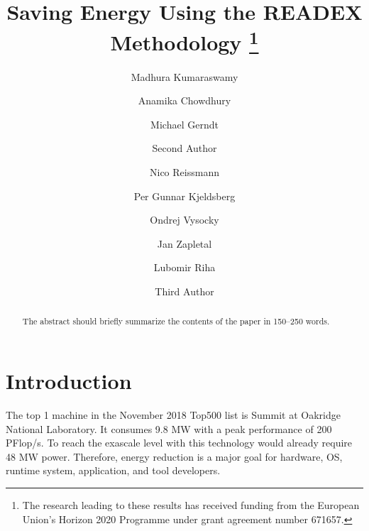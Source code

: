 \documentclass[runningheads]{llncs}
\begin{document}
%
\title{Saving Energy Using the READEX Methodology \thanks{The research leading to these results has received funding from the European Union's Horizon 2020 Programme under grant agreement number 671657.}}
%
%
\author{Madhura Kumaraswamy \and Anamika Chowdhury \and Michael Gerndt  \and
Second Author \and
Nico Reissmann  \and Per Gunnar Kjeldsberg  \and
Ondrej Vysocky  \and Jan Zapletal  \and Lubomir Riha 
\and Third Author}
%
%

\maketitle              %

\begin{abstract}
The abstract should briefly summarize the contents of the paper in
150--250 words.

\end{abstract}

\section{Introduction} \label{sec:introduction}

The top 1 machine in the November 2018 Top500 list is Summit at Oakridge National Laboratory. It consumes 9.8 MW with a peak performance of 200 PFlop/s. To reach the exascale level with this technology would already require 48 MW power. Therefore, energy reduction is a major goal for hardware, OS, runtime system, application, and tool developers. 
\end{document}
